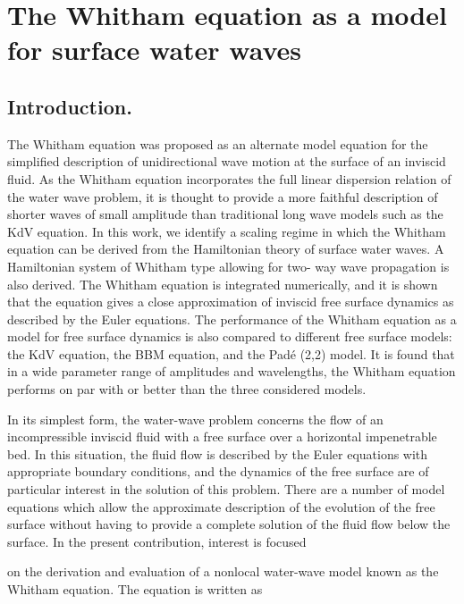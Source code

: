 \section{The Whitham equation as a model for surface water waves}
\subsection{Introduction.}
The Whitham equation was proposed as an alternate model equation for the simplified description of unidirectional 
wave motion at the surface of an inviscid fluid. As the Whitham equation incorporates the full
linear dispersion relation of the water wave problem, it is thought to provide a more faithful description
of shorter waves of small amplitude than traditional long wave models such as the KdV equation.
In this work, we identify a scaling regime in which the Whitham equation can be derived from the
Hamiltonian theory of surface water waves. A Hamiltonian system of Whitham type allowing for two-
way wave propagation is also derived. The Whitham equation is integrated numerically, and it is shown
that the equation gives a close approximation of inviscid free surface dynamics as described by the
Euler equations. The performance of the Whitham equation as a model for free surface dynamics is also
compared to different free surface models: the KdV equation, the BBM equation, and the Pad\'e (2,2) model.
It is found that in a wide parameter range of amplitudes and wavelengths, the Whitham equation performs
on par with or better than the three considered models.


In its simplest form, the water-wave problem concerns the
flow of an incompressible inviscid fluid with a free surface over
a horizontal impenetrable bed. In this situation, the fluid flow
is described by the Euler equations with appropriate boundary
conditions, and the dynamics of the free surface are of particular
interest in the solution of this problem.
There are a number of model equations which allow the
approximate description of the evolution of the free surface
without having to provide a complete solution of the fluid flow
below the surface. In the present contribution, interest is focused

on the derivation and evaluation of a nonlocal water-wave model
known as the Whitham equation. The equation is written as

